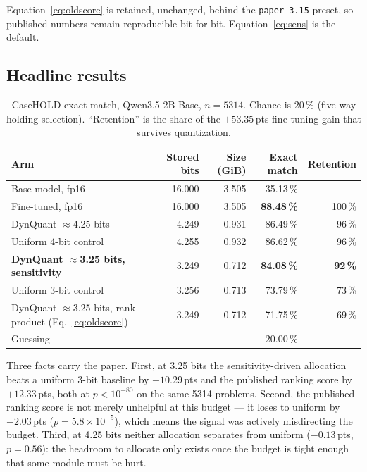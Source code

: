 \documentclass[11pt]{article}
\newcommand{\pt}{\,pts}
\newcommand{\pct}{\,\%}
\newcommand{\code}[1]{\texttt{#1}}
\begin{document}
Equation~\ref{eq:oldscore} is retained, unchanged, behind the \code{paper-3.15} preset, so
published numbers remain reproducible bit-for-bit. Equation~\ref{eq:sens} is the default.

\subsection{Headline results}

\begin{table}[H]
\centering\small
\caption{CaseHOLD exact match, Qwen3.5-2B-Base, $n=5314$. Chance is 20\pct{} (five-way holding
selection). ``Retention'' is the share of the $+53.35$\pt{} fine-tuning gain that survives
quantization.}
\begin{tabular}{lrrrr}
\toprule
Arm & Stored bits & Size (GiB) & Exact match & Retention \\
\midrule
Base model, fp16                       & 16.000 & 3.505 & 35.13\pct & --- \\
\rowcolor{rowtint}
Fine-tuned, fp16                       & 16.000 & 3.505 & \textbf{88.48\pct} & 100\pct \\
DynQuant $\approx$4.25 bits            & 4.249 & 0.931 & 86.49\pct & 96\pct \\
Uniform 4-bit control                  & 4.255 & 0.932 & 86.62\pct & 96\pct \\
\rowcolor{rowtint}
\textbf{DynQuant $\approx$3.25 bits, sensitivity} & 3.249 & 0.712 & \textbf{84.08\pct} & \textbf{92\pct} \\
Uniform 3-bit control                  & 3.256 & 0.713 & 73.79\pct & 73\pct \\
DynQuant $\approx$3.25 bits, rank product (Eq.~\ref{eq:oldscore}) & 3.249 & 0.712 & 71.75\pct & 69\pct \\
\midrule
Guessing                               & --- & --- & 20.00\pct & --- \\
\bottomrule
\end{tabular}
\end{table}

Three facts carry the paper. First, at 3.25 bits the sensitivity-driven allocation beats a
uniform 3-bit baseline by $+10.29$\pt{} and the published ranking score by $+12.33$\pt, both at
$p < 10^{-80}$ on the same 5314 problems. Second, the published ranking score is not merely
unhelpful at this budget --- it loses to uniform by $-2.03$\pt{} ($p = 5.8\times10^{-5}$), which
means the signal was actively misdirecting the budget. Third, at 4.25 bits neither allocation
separates from uniform ($-0.13$\pt, $p = 0.56$): the headroom to allocate only exists once the
budget is tight enough that some module must be hurt.
\end{document}
